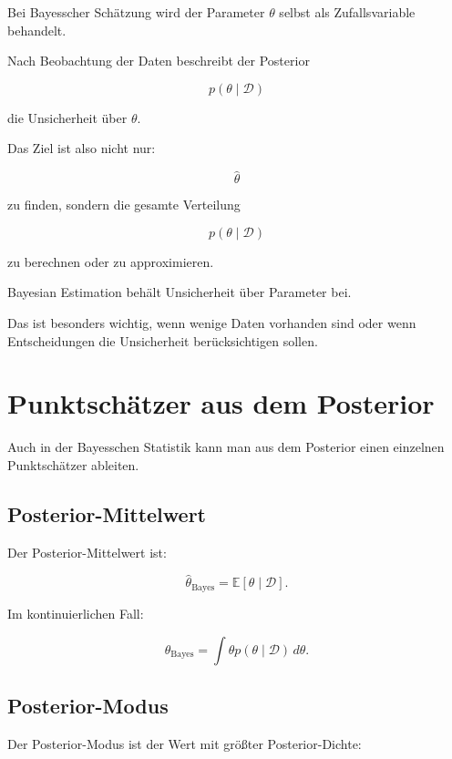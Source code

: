\begin{definitionbox}
Bei Bayesscher Schätzung wird der Parameter \(\theta\) selbst als Zufallsvariable behandelt.

Nach Beobachtung der Daten beschreibt der Posterior

\[
    p(\theta \mid \mathcal{D})
\]

die Unsicherheit über \(\theta\).
\end{definitionbox}

Das Ziel ist also nicht nur:

\[
    \hat{\theta}
\]

zu finden, sondern die gesamte Verteilung

\[
    p(\theta \mid \mathcal{D})
\]

zu berechnen oder zu approximieren.

\begin{conceptbox}
Bayesian Estimation behält Unsicherheit über Parameter bei.

Das ist besonders wichtig, wenn wenige Daten vorhanden sind oder wenn Entscheidungen die Unsicherheit berücksichtigen sollen.
\end{conceptbox}

\section{Punktschätzer aus dem Posterior}

Auch in der Bayesschen Statistik kann man aus dem Posterior einen einzelnen Punktschätzer ableiten.

\subsection{Posterior-Mittelwert}

Der Posterior-Mittelwert ist:

\[
    \hat{\theta}_{\mathrm{Bayes}}
    =
    \mathbb{E}[\theta \mid \mathcal{D}].
\]

Im kontinuierlichen Fall:

\[
    \hat{\theta}_{\mathrm{Bayes}}
    =
    \int
    \theta
    p(\theta \mid \mathcal{D})
    \,d\theta.
\]

\subsection{Posterior-Modus}

Der Posterior-Modus ist der Wert mit größter Posterior-Dichte:


